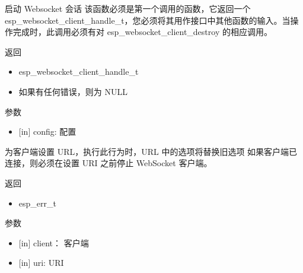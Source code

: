 \documentclass[a4paper,12pt,english]{sphinxmanual}
\begin{document}
{{\sphinxAtStartPar
启动 Websocket 会话 该函数必须是第一个调用的函数，它返回一个 esp\_websocket\_client\_handle\_t，您必须将其用作接口中其他函数的输入。当操作完成时，此调用必须有对 esp\_websocket\_client\_destroy 的相应调用。

\sphinxAtStartPar
返回
\begin{itemize}
\item {} 
\sphinxAtStartPar
esp\_websocket\_client\_handle\_t

\item {} 
\sphinxAtStartPar
如果有任何错误，则为 NULL

\end{itemize}

\sphinxAtStartPar
参数
\begin{itemize}
\item {} 
\sphinxAtStartPar
{[}in{]} config: 配置

\end{itemize}

\begin{sphinxVerbatim}[commandchars=\\\{\}]
\end{sphinxVerbatim}

\sphinxAtStartPar
为客户端设置 URL，执行此行为时，URL 中的选项将替换旧选项 如果客户端已连接，则必须在设置 URI 之前停止 WebSocket 客户端。

\sphinxAtStartPar
返回
\begin{itemize}
\item {} 
\sphinxAtStartPar
esp\_err\_t

\end{itemize}

\sphinxAtStartPar
参数
\begin{itemize}
\item {} 
\sphinxAtStartPar
{[}in{]} client： 客户端

\item {} 
\sphinxAtStartPar
{[}in{]} uri: URI

\end{itemize}

\begin{sphinxVerbatim}[commandchars=\\\{\}]
\end{sphinxVerbatim}

}}
\end{document}
